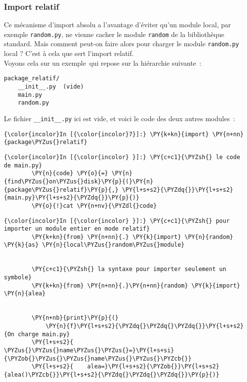     \hypertarget{import-relatif}{%
\subsubsection{Import relatif}\label{import-relatif}}

    Ce mécanisme d'import absolu a l'avantage d'éviter qu'un module local,
par exemple \texttt{random.py}, ne vienne cacher le module
\texttt{random} de la bibliothèque standard. Mais comment peut-on faire
alors pour charger le module \texttt{random.py} local ? C'est à cela que
sert l'import relatif.\\

Voyons cela sur un exemple~qui repose sur la hiérarchie suivante~:

\begin{verbatim}
package_relatif/
    __init__.py  (vide)
    main.py
    random.py
\end{verbatim}

    Le fichier \texttt{\_\_init\_\_.py} ici est vide, et voici le code des
deux autres modules~:

    \begin{Verbatim}[commandchars=\\\{\}]
{\color{incolor}In [{\color{incolor}7}]:} \PY{k+kn}{import} \PY{n+nn}{package\PYZus{}relatif}
\end{Verbatim}


    \begin{Verbatim}[commandchars=\\\{\}]
{\color{incolor}In [{\color{incolor} }]:} \PY{c+c1}{\PYZsh{} le code de main.py}
        \PY{n}{code} \PY{o}{=} \PY{n}{find\PYZus{}on\PYZus{}disk}\PY{p}{(}\PY{n}{package\PYZus{}relatif}\PY{p}{,} \PY{l+s+s2}{\PYZdq{}}\PY{l+s+s2}{main.py}\PY{l+s+s2}{\PYZdq{}}\PY{p}{)}
        \PY{o}{!}cat \PY{n+nv}{\PYZdl{}code}
\end{Verbatim}


    \begin{Verbatim}[commandchars=\\\{\}]
{\color{incolor}In [{\color{incolor} }]:} \PY{c+c1}{\PYZsh{} pour importer un module entier en mode relatif}
        \PY{k+kn}{from} \PY{n+nn}{.} \PY{k}{import} \PY{n}{random} \PY{k}{as} \PY{n}{local\PYZus{}random\PYZus{}module}
        
        
        \PY{c+c1}{\PYZsh{} la syntaxe pour importer seulement un symbole}
        \PY{k+kn}{from} \PY{n+nn}{.}\PY{n+nn}{random} \PY{k}{import} \PY{n}{alea}
        
        
        \PY{n+nb}{print}\PY{p}{(}
            \PY{n}{f}\PY{l+s+s2}{\PYZdq{}\PYZdq{}\PYZdq{}}\PY{l+s+s2}{On charge main.py}
        \PY{l+s+s2}{    \PYZus{}\PYZus{}name\PYZus{}\PYZus{}=}\PY{l+s+si}{\PYZob{}\PYZus{}\PYZus{}name\PYZus{}\PYZus{}\PYZcb{}}
        \PY{l+s+s2}{    alea=}\PY{l+s+s2}{\PYZob{}}\PY{l+s+s2}{alea()\PYZcb{}}\PY{l+s+s2}{\PYZdq{}\PYZdq{}\PYZdq{}}\PY{p}{)}
\end{Verbatim}


